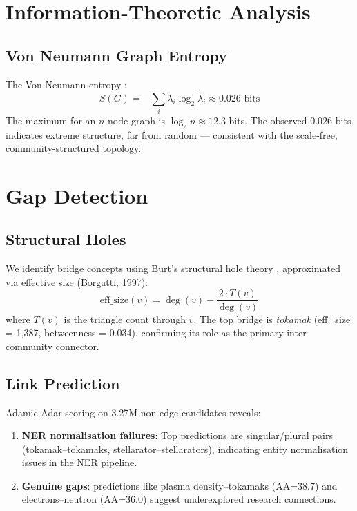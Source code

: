 \documentclass[11pt,a4paper]{article}
\begin{document}
\section{Information-Theoretic Analysis}

\subsection{Von Neumann Graph Entropy}

The Von Neumann entropy \citep{braunstein2006}:
\begin{equation}
  S(G) = -\sum_i \tilde{\lambda}_i \log_2 \tilde{\lambda}_i \approx 0.026 \text{ bits}
\end{equation}
The maximum for an $n$-node graph is $\log_2 n \approx 12.3$ bits.  The observed 0.026 bits indicates extreme structure, far from random --- consistent with the scale-free, community-structured topology.

\section{Gap Detection}

\subsection{Structural Holes}

We identify bridge concepts using Burt's structural hole theory \citep{burt1992}, approximated via effective size (Borgatti, 1997):
\begin{equation}
  \text{eff\_size}(v) = \deg(v) - \frac{2 \cdot T(v)}{\deg(v)}
\end{equation}
where $T(v)$ is the triangle count through $v$.  The top bridge is \emph{tokamak} (eff.\ size = 1,387, betweenness = 0.034), confirming its role as the primary inter-community connector.

\subsection{Link Prediction}

Adamic-Adar scoring \citep{libennowell2007} on 3.27M non-edge candidates reveals:
\begin{enumerate}
  \item \textbf{NER normalisation failures}: Top predictions are singular/plural pairs (tokamak--tokamaks, stellarator--stellarators), indicating entity normalisation issues in the NER pipeline.
  \item \textbf{Genuine gaps}: predictions like plasma density--tokamaks (AA=38.7) and electrons--neutron (AA=36.0) suggest underexplored research connections.
\end{enumerate}
\end{document}
